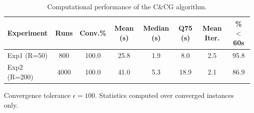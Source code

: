 \begin{table}[H]
\centering
\caption{Computational performance of the C\&CG algorithm.}
\label{tab:comp_performance}
\begin{threeparttable}
\small
\renewcommand{\arraystretch}{1.3}
\begin{tabular}{l S[round-precision=0,table-format=4.0] S[round-precision=1,table-format=3.1] S[round-precision=1,table-format=3.1] S[round-precision=1,table-format=4.1] S[round-precision=1,table-format=4.1] S[round-precision=1,table-format=3.1] S[round-precision=1,table-format=3.1]}
\toprule
{Experiment} & {Runs} & {Conv.\%} & {Mean (s)} & {Median (s)} & {Q75 (s)} & {Mean Iter.} & {\% $<$60s} \\
\midrule
Exp1 (R=50) & 800 & 100.0 & 25.8 & 1.9 & 8.0 & 2.5 & 95.8 \\
Exp2 (R=200) & 4000 & 100.0 & 41.0 & 5.3 & 18.9 & 2.1 & 86.9 \\
\bottomrule
\end{tabular}
\begin{tablenotes}
\footnotesize
\item Convergence tolerance $\epsilon = 100$. Statistics computed over converged instances only.
\end{tablenotes}
\end{threeparttable}
\end{table}